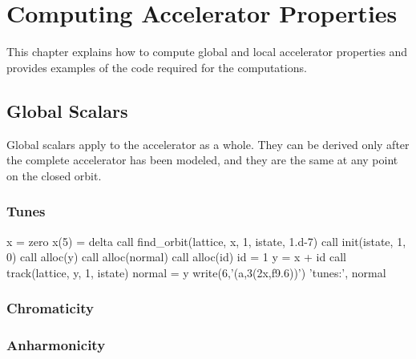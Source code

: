
\chapter{Computing Accelerator Properties}
\label{cha:accel.properties}

This chapter explains how to compute global and local accelerator
properties and provides examples of the code required for the computations.


\section{Global Scalars}

%
Global scalars apply to the accelerator as a whole. They can be
derived only after the complete accelerator has been modeled, and
they are the same at any point on the closed orbit.


\subsection{Tunes}

\makeusother
\begin{ptccode}
x = zero
x(5) = delta
call find_orbit(lattice, x, 1, istate, 1.d-7)
call init(istate, 1, 0)
call alloc(y)
call alloc(normal)
call alloc(id)
id = 1
y = x + id
call track(lattice, y, 1, istate)
normal = y
write(6,'(a,3(2x,f9.6))') 'tunes:', normal%
\end{ptccode}
\makeussubscript


\subsection{Chromaticity}



\subsection{Anharmonicity}



